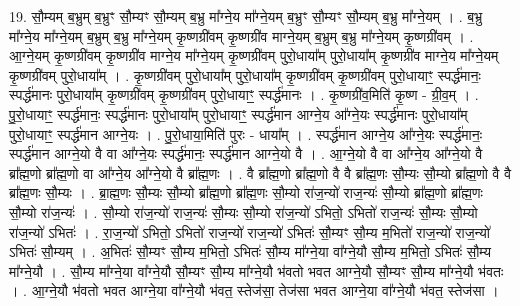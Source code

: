 \documentclass[17pt]{extarticle}
\begin{document}
19. सौ॒म्यम् ब॒भ्रुम् ब॒भ्रुꣳ सौ॒म्यꣳ सौ॒म्यम् ब॒भ्रु मा᳚ग्ने॒य मा᳚ग्ने॒यम् ब॒भ्रुꣳ सौ॒म्यꣳ सौ॒म्यम् ब॒भ्रु मा᳚ग्ने॒यम् । . ब॒भ्रु मा᳚ग्ने॒य मा᳚ग्ने॒यम् ब॒भ्रुम् ब॒भ्रु मा᳚ग्ने॒यम् कृ॒ष्णग्री॑वम् कृ॒ष्णग्री॑व माग्ने॒यम् ब॒भ्रुम् ब॒भ्रु मा᳚ग्ने॒यम् कृ॒ष्णग्री॑वम् । . आ॒ग्ने॒यम् कृ॒ष्णग्री॑वम् कृ॒ष्णग्री॑व माग्ने॒य मा᳚ग्ने॒यम् कृ॒ष्णग्री॑वम् पुरो॒धाया᳚म् पुरो॒धाया᳚म् कृ॒ष्णग्री॑व माग्ने॒य मा᳚ग्ने॒यम् कृ॒ष्णग्री॑वम् पुरो॒धाया᳚म् । . कृ॒ष्णग्री॑वम् पुरो॒धाया᳚म् पुरो॒धाया᳚म् कृ॒ष्णग्री॑वम् कृ॒ष्णग्री॑वम् पुरो॒धायाꣳ॒॒ स्पर्द्ध॑मानः॒ स्पर्द्ध॑मानः पुरो॒धाया᳚म् कृ॒ष्णग्री॑वम् कृ॒ष्णग्री॑वम् पुरो॒धायाꣳ॒॒ स्पर्द्ध॑मानः । . कृ॒ष्णग्री॑व॒मिति॑ कृ॒ष्ण - ग्री॒व॒म् । . पु॒रो॒धायाꣳ॒॒ स्पर्द्ध॑मानः॒ स्पर्द्ध॑मानः पुरो॒धाया᳚म् पुरो॒धायाꣳ॒॒ स्पर्द्ध॑मान आग्ने॒य आ᳚ग्ने॒यः स्पर्द्ध॑मानः पुरो॒धाया᳚म् पुरो॒धायाꣳ॒॒ स्पर्द्ध॑मान आग्ने॒यः । . पु॒रो॒धाया॒मिति॑ पुरः - धाया᳚म् । . स्पर्द्ध॑मान आग्ने॒य आ᳚ग्ने॒यः स्पर्द्ध॑मानः॒ स्पर्द्ध॑मान आग्ने॒यो वै वा आ᳚ग्ने॒यः स्पर्द्ध॑मानः॒ स्पर्द्ध॑मान आग्ने॒यो वै । . आ॒ग्ने॒यो वै वा आ᳚ग्ने॒य आ᳚ग्ने॒यो वै ब्रा᳚ह्म॒णो ब्रा᳚ह्म॒णो वा आ᳚ग्ने॒य आ᳚ग्ने॒यो वै ब्रा᳚ह्म॒णः । . वै ब्रा᳚ह्म॒णो ब्रा᳚ह्म॒णो वै वै ब्रा᳚ह्म॒णः सौ॒म्यः सौ॒म्यो ब्रा᳚ह्म॒णो वै वै ब्रा᳚ह्म॒णः सौ॒म्यः । . ब्रा॒ह्म॒णः सौ॒म्यः सौ॒म्यो ब्रा᳚ह्म॒णो ब्रा᳚ह्म॒णः सौ॒म्यो रा॑ज॒न्यो॑ राज॒न्यः॑ सौ॒म्यो ब्रा᳚ह्म॒णो ब्रा᳚ह्म॒णः सौ॒म्यो रा॑ज॒न्यः॑ । . सौ॒म्यो रा॑ज॒न्यो॑ राज॒न्यः॑ सौ॒म्यः सौ॒म्यो रा॑ज॒न्यो॑ ऽभितो॒ ऽभितो॑ राज॒न्यः॑ सौ॒म्यः सौ॒म्यो रा॑ज॒न्यो॑ ऽभितः॑ । . रा॒ज॒न्यो॑ ऽभितो॒ ऽभितो॑ राज॒न्यो॑ राज॒न्यो॑ ऽभितः॑ सौ॒म्यꣳ सौ॒म्य म॒भितो॑ राज॒न्यो॑ राज॒न्यो॑ ऽभितः॑ सौ॒म्यम् । . अ॒भितः॑ सौ॒म्यꣳ सौ॒म्य म॒भितो॒ ऽभितः॑ सौ॒म्य मा᳚ग्ने॒या वा᳚ग्ने॒यौ सौ॒म्य म॒भितो॒ ऽभितः॑ सौ॒म्य मा᳚ग्ने॒यौ । . सौ॒म्य मा᳚ग्ने॒या वा᳚ग्ने॒यौ सौ॒म्यꣳ सौ॒म्य मा᳚ग्ने॒यौ भ॑वतो भवत आग्ने॒यौ सौ॒म्यꣳ सौ॒म्य मा᳚ग्ने॒यौ भ॑वतः । . आ॒ग्ने॒यौ भ॑वतो भवत आग्ने॒या वा᳚ग्ने॒यौ भ॑वत॒ स्तेज॑सा॒ तेज॑सा भवत आग्ने॒या वा᳚ग्ने॒यौ भ॑वत॒ स्तेज॑सा । \newline
\end{document}
